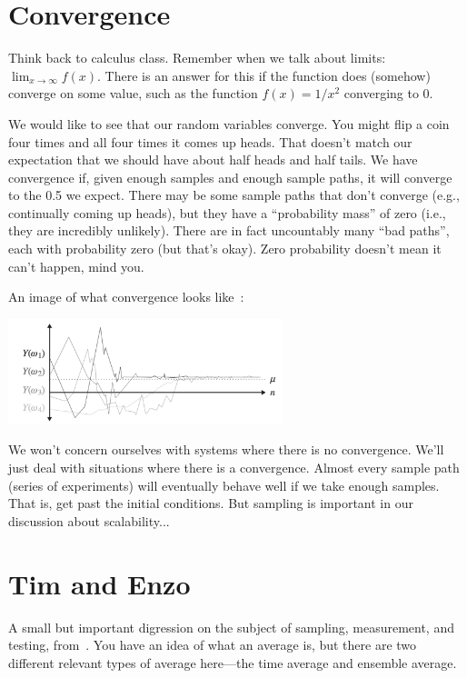 




\section*{Convergence}

Think back to calculus class. Remember when we talk about limits: $\lim_{x\to\infty} f(x)$. There is an answer for this if the function does (somehow) converge on some value, such as the function $f(x) = 1/x^{2}$ converging to 0.

We would like to see that our random variables converge. You might flip a coin four times and all four times it comes up heads. That doesn't match our expectation that we should have about half heads and half tails. We have convergence if, given enough samples and enough sample paths, it will converge to the 0.5 we expect. There may be some sample paths that don't converge (e.g., continually coming up heads), but they have a ``probability mass'' of zero (i.e., they are incredibly unlikely).  There are in fact uncountably many ``bad paths'', each with probability zero (but that's okay). Zero probability doesn't mean it can't happen, mind you.

An image of what convergence looks like~\cite{pmd}:

\begin{center}
	\includegraphics[width=0.6\textwidth]{images/convergence.png}
\end{center}

We won't concern ourselves with systems where there is no convergence. We'll just deal with situations where there is a convergence. Almost every sample path (series of experiments) will eventually behave well if we take enough samples. That is, get past the initial conditions. But sampling is important in our discussion about scalability...

\section*{Tim and Enzo}
A small but important digression on the subject of sampling, measurement, and testing, from~\cite{pmd}. You have an idea of what an average is, but there are two different relevant types of average here---the time average and ensemble average. 

